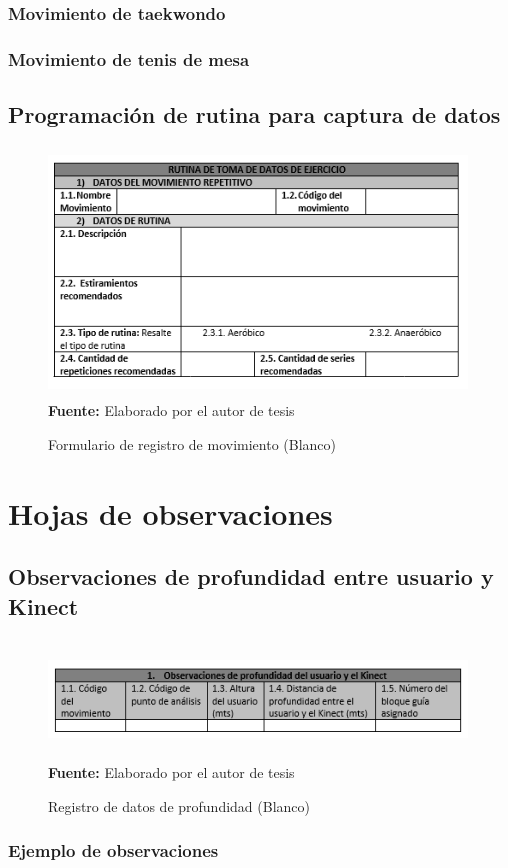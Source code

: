 \subsubsection{Movimiento de taekwondo}
\subsubsection{Movimiento de tenis de mesa}
\subsection{Programaci\'on de rutina para captura de datos}
\begin{figure}[H]
	\caption{Formulario de  registro de movimiento (Blanco)}
	\label{fig:frmWhiteRout}
	\centering
	\includegraphics[width=420px,height=250px]{graphics/frm-rutina.PNG} \\
	\textbf{Fuente:} Elaborado por el autor de tesis
\end{figure}
\section{Hojas de observaciones}
\subsection{Observaciones de profundidad entre usuario y Kinect}
\begin{figure}[H]
	\caption{Registro de datos de profundidad (Blanco)}
	\label{fig:PObvDeep}
	\centering
	\includegraphics[width=420px,height=120px]{graphics/hObv-ProfundidadKinect.PNG} \\
	\textbf{Fuente:} Elaborado por el autor de tesis
\end{figure}
\subsubsection{Ejemplo de observaciones}

